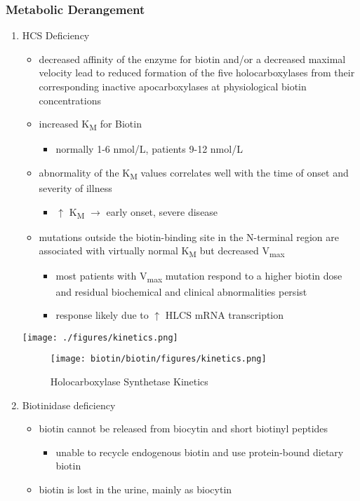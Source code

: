 \documentclass{scrartcl}
\begin{document}
\subsubsection{Metabolic Derangement}
\label{sec:org74738ad}
\begin{enumerate}
\item HCS Deficiency
\label{sec:org5082a27}
\begin{itemize}
\item decreased affinity of the enzyme for biotin and/or a decreased
maximal velocity lead to reduced formation of the five
holocarboxylases from their corresponding inactive apocarboxylases
at physiological biotin concentrations
\item increased K\textsubscript{M} for Biotin
\begin{itemize}
\item normally 1-6 nmol/L, patients 9-12 nmol/L
\end{itemize}
\item abnormality of the K\textsubscript{M} values correlates well with the time of onset
and severity of illness
\begin{itemize}
\item \(\uparrow\) K\textsubscript{M} \(\to\) early onset, severe disease
\end{itemize}

\item mutations outside the biotin-binding site in the N-terminal region
are associated with virtually normal K\textsubscript{M} but decreased V\textsubscript{max}
\begin{itemize}
\item most patients with V\textsubscript{max} mutation respond to a higher biotin
dose and residual biochemical and clinical abnormalities persist
\item response likely due to \(\uparrow\) HLCS mRNA transcription
\end{itemize}
\end{itemize}

\begin{center}
\texttt{[image: ./figures/kinetics.png]}
\end{center}

\begin{figure}[htbp]
\centering
\texttt{[image: biotin/biotin/figures/kinetics.png]}
\caption[Kinetics]{\label{fig:org83fbe04}Holocarboxylase Synthetase Kinetics}
\end{figure}

\item Biotinidase deficiency
\label{sec:org423adf7}
\begin{itemize}
\item biotin cannot be released from biocytin and short biotinyl
peptides
\begin{itemize}
\item unable to recycle endogenous biotin and use protein-bound dietary biotin
\end{itemize}
\item biotin is lost in the urine, mainly as biocytin
\end{itemize}
\end{enumerate}
\end{document}

